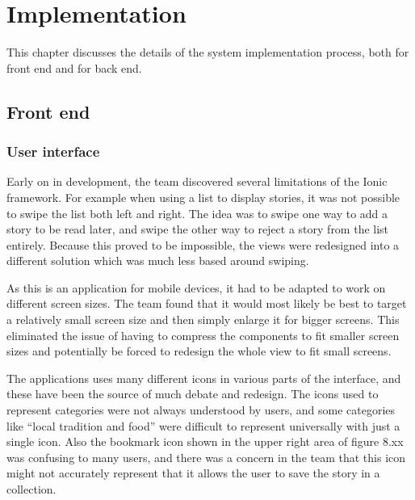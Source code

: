
\chapter{Implementation}

This chapter discusses the details of the system implementation process, both for front end and for back end.

\section{Front end}

\subsection{User interface}

Early on in development, the team discovered several limitations of the Ionic framework. For example when using a list to display stories, it was not possible to swipe the list both left and right. The idea was to swipe one way to add a story to be read later, and swipe the other way to reject a story from the list entirely.  Because this proved to be impossible, the views were redesigned into a different solution which was much less based around swiping.\newline

As this is an application for mobile devices, it had to be adapted to work on different screen sizes. The team found that it would most likely be best to target a relatively small screen size and then simply enlarge it for bigger screens. This eliminated the issue of having to compress the components to fit smaller screen sizes and potentially be forced to redesign the whole view to fit small screens.\newline

The applications uses many different icons in various parts of the interface, and these have been the source of much debate and redesign. The icons used to represent categories were not always understood by users, and some categories like “local tradition and food” were difficult to represent universally with just a single icon. Also the bookmark icon shown in the upper right area of figure 8.xx was confusing to many users, and there was a concern in the team that this icon might not accurately represent that it allows the user to save the story in a collection.\newline

